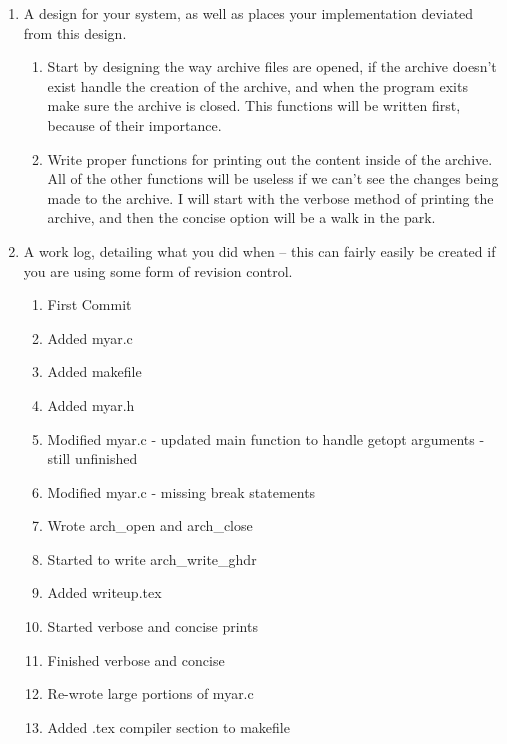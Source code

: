 \documentclass[letterpaper,10pt,titlepage]{article}
\begin{document}
\begin{enumerate}
	\item A design for your system, as well as places your implementation
deviated from this design.
		\begin{enumerate}
			\item Start by designing the way archive files are
opened, if the archive doesn't exist handle the creation of the archive, and
when the program exits make sure the archive is closed. This functions will be
written first, because of their importance.
			\item Write proper functions for printing out the
content inside of the archive. All of the other functions will be useless if we
can't see the changes being made to the archive. I will start with the verbose
method of printing the archive, and then the concise option will be a walk in
the park. 
		\end{enumerate}

	\item A work log, detailing what you did when -- this can fairly easily
be created if you are using some form of revision control.
		\begin{enumerate}
			\item First Commit
			\item Added myar.c
			\item Added makefile
			\item Added myar.h
			\item Modified myar.c - updated main function to handle
getopt arguments - still unfinished
			\item Modified myar.c - missing break statements
			\item Wrote arch\_open and arch\_close
			\item Started to write arch\_write\_ghdr
			\item Added writeup.tex
			\item Started verbose and concise prints
			\item Finished verbose and concise
			\item Re-wrote large portions of myar.c
			\item Added .tex compiler section to makefile
		\end{enumerate}		


\end{enumerate}
\end{document}
